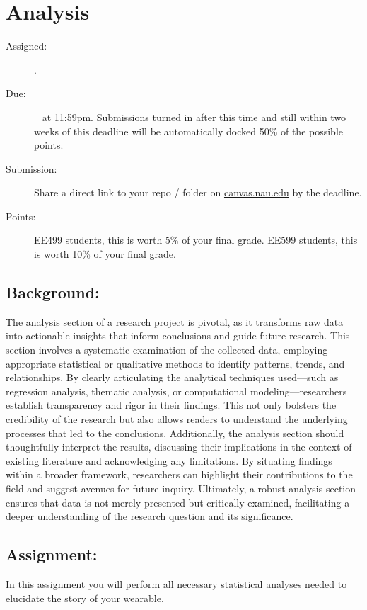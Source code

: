 \documentclass[11pt]{article}
\begin{document}
\section{Analysis}
\begin{description}
	\item [Assigned:] \wkElevenTu. %
	\item [Due:] \wkThirteenTu~ at 11:59pm. Submissions turned in after this time and still within two weeks of this deadline will be automatically docked 50\% of the possible points. %
	\item [Submission:] Share a direct link to your repo / folder on \href{https://canvas.nau.edu}{canvas.nau.edu} by the deadline.
	\item [Points:] EE499 students, this is worth 5\% of your final grade.  EE599 students, this is worth 10\% of your final grade.
\end{description}

\subsection*{Background:}
The analysis section of a research project is pivotal, as it transforms raw data into actionable insights that inform conclusions and guide future research. This section involves a systematic examination of the collected data, employing appropriate statistical or qualitative methods to identify patterns, trends, and relationships. By clearly articulating the analytical techniques used—such as regression analysis, thematic analysis, or computational modeling—researchers establish transparency and rigor in their findings. This not only bolsters the credibility of the research but also allows readers to understand the underlying processes that led to the conclusions. Additionally, the analysis section should thoughtfully interpret the results, discussing their implications in the context of existing literature and acknowledging any limitations. By situating findings within a broader framework, researchers can highlight their contributions to the field and suggest avenues for future inquiry. Ultimately, a robust analysis section ensures that data is not merely presented but critically examined, facilitating a deeper understanding of the research question and its significance.

\subsection*{Assignment:}
In this assignment you will perform all necessary statistical analyses needed to elucidate the story of your wearable.
\end{document}
